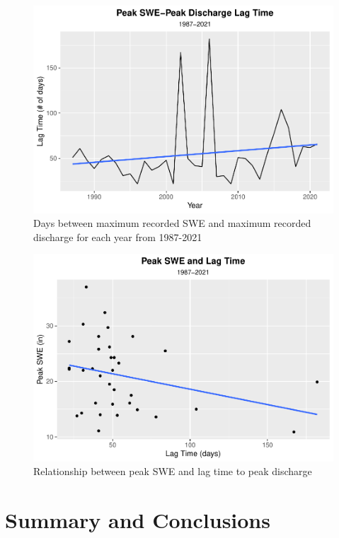 \documentclass[
  12pt,
]{article}
\begin{document}
\begin{figure}
\centering
\includegraphics{Final_Report_files/figure-latex/unnamed-chunk-6-1.pdf}
\caption{Days between maximum recorded SWE and maximum recorded
discharge for each year from 1987-2021}
\end{figure}

\begin{figure}
\centering
\includegraphics{Final_Report_files/figure-latex/unnamed-chunk-7-1.pdf}
\caption{Relationship between peak SWE and lag time to peak discharge}
\end{figure}

\newpage

\hypertarget{summary-and-conclusions}{%
\section{Summary and Conclusions}\label{summary-and-conclusions}}
\end{document}

